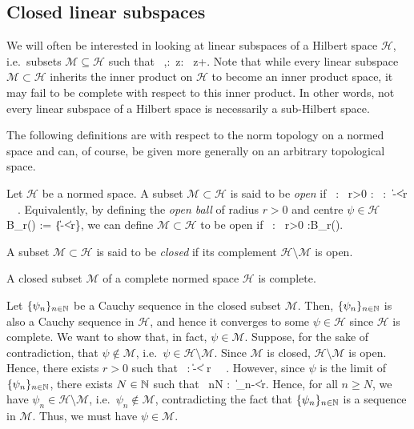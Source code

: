 \subsection{Closed linear subspaces}

We will often be interested in looking at linear subspaces of a Hilbert space $\mathcal{H}$, i.e.\ subsets $\mathcal{M}\subseteq\mathcal{H}$ such that
\bse
\forall \, \psi,\varphi\in{}:\forall \, z\in \C : \ z\psi+\varphi\in {}.
\ese
Note that while every linear subspace $\mathcal{M}\subset \mathcal{H}$ inherits the inner product on $\mathcal{H}$ to become an inner product space, it may fail to be complete with respect to this inner product. In other words, not every linear subspace of a Hilbert space is necessarily a sub-Hilbert space.

The following definitions are with respect to the norm topology on a normed space and can, of course, be given more generally on an arbitrary topological space.

\bd
Let $\mathcal{H}$ be a normed space. A subset $\mathcal{M}\subset \mathcal{H}$ is said to be \emph{open} if
\bse
\forall \, \psi \in {} : \exists \, r>0 : \forall \, \varphi\in {} : \ \|\psi-\varphi\|<r \, \Rightarrow\, \varphi\in{}.
\ese
\ed
Equivalently, by defining the \emph{open ball} of radius $r>0$ and centre $\psi\in\mathcal{H}$
\bse
B_r(\psi) := \{\varphi\in{}\mid\|\psi-\varphi\|<r\},
\ese
we can define $\mathcal{M}\subset \mathcal{H}$ to be open if
\bse
\forall \, \psi \in {} : \exists \, r>0 :B_r(\psi)\subseteq{}.
\ese

\bd
A subset $\mathcal{M}\subset \mathcal{H}$ is said to be \emph{closed} if its complement $\mathcal{H}\setminus \mathcal{M}$ is open.
\ed

\bp
A closed subset $\mathcal{M}$ of a complete normed space $\mathcal{H}$ is complete.
\ep

\bq
Let $\{\psi_n\}_{n\in \mathbb{N}}$ be a Cauchy sequence in the closed subset $\mathcal{M}$. Then, $\{\psi_n\}_{n\in \mathbb{N}}$ is also a Cauchy sequence in $\mathcal{H}$, and hence it converges to some $\psi\in\mathcal{H}$ since $\mathcal{H}$ is complete. 
We want to show that, in fact, $\psi\in\mathcal{M}$. Suppose, for the sake of contradiction, that $\psi\notin\mathcal{M}$, i.e.\ $\psi\in\mathcal{H}\setminus\mathcal{M}$. Since $\mathcal{M}$ is closed, $\mathcal{H}\setminus \mathcal{M}$ is open. Hence, there exists $r>0$ such that
\bse
\forall \, \varphi\in{}:\ \|\varphi -\psi\|< r \, \Rightarrow \, \varphi \in {}\setminus {}.
\ese
However, since $\psi$ is the limit of $\{\psi_n\}_{n\in \mathbb{N}}$, there exists $N\in \mathbb{N}$ such that
\bse
\forall \, n\geq N : \ \|\psi_n-\psi\|<r.
\ese
Hence, for all $n\geq N$, we have $\psi_n \in  \mathcal{H}\setminus \mathcal{M}$, i.e.\  $\psi_n \notin\mathcal{M}$, contradicting the fact that  $\{\psi_n\}_{n\in \mathbb{N}}$ is a sequence in $\mathcal{M}$. Thus, we must have $\psi\in\mathcal{M}$.
\eq

